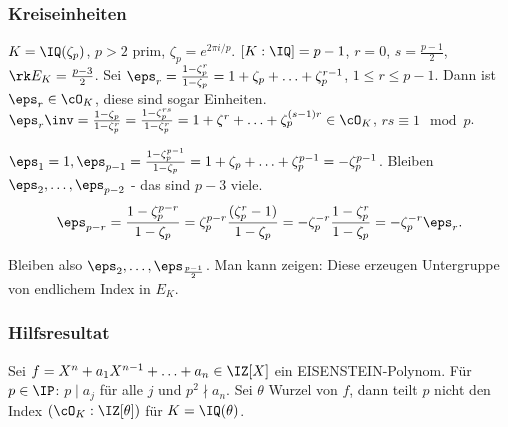 \subsubsection{Kreiseinheiten}
$K=\IQ(\zeta_p)$, $p>2$ prim, $\zeta_p=e^{2\pi i/p}$. $[K:\IQ]=p-1$, $r=0$, $s=\frac{p-1}{2}$, $\rk E_K=\frac{p-3}{2}$. Sei $\eps_r=\frac{1-\zeta_p^r}{1-\zeta_p}=1+\zeta_p+\ldots+\zeta_p^{r-1}$, $1\leq r\leq p-1$.
Dann ist $\eps_r\in\cO_K$, diese sind sogar Einheiten. $\eps_r\inv=\frac{1-\zeta_p}{1-\zeta_p^r}=\frac{1-\zeta_p^{rs}}{1-\zeta_p^r}=1+\zeta^r+\ldots +\zeta_p^{(s-1)r}\in\cO_K$, $rs\equiv 1\mod{p}$.

$\eps_1=1, \eps_{p-1}=\frac{1-\zeta_p^{p-1}}{1-\zeta_p}=1+\zeta_p+\ldots+\zeta_p^{p-1}=-\zeta_p^{p-1}$. Bleiben $\eps_2,\ldots,\eps_{p-2}$ -  das sind $p-3$ viele.
\[ \eps_{p-r} = \frac{1-\zeta_p^{p-r}}{1-\zeta_p}=\zeta_p^{p-r}\frac{(\zeta_p^r-1)}{1-\zeta_p}=-\zeta_p^{-r} \frac{1-\zeta_p^r}{1-\zeta_p}=-\zeta_p^{-r}\eps_r.\]

Bleiben also $\eps_2,\ldots,\eps_{\frac{p-1}{2}}$. Man kann zeigen: Diese erzeugen Untergruppe von endlichem Index in $E_K$.

\subsubsection{Hilfsresultat}
\begin{Fakt}
 Sei $f=X^n+a_1X^{n-1}+\ldots+a_n\in\IZ[X]$ ein EISENSTEIN-Polynom. Für $p\in\IP$: $p\mid a_j$ für alle $j$ und $p^2\nmid a_n$. Sei $\theta$ Wurzel von $f$, dann teilt $p$ nicht den Index $(\cO_K:\IZ[\theta])$ für $K=\IQ(\theta)$.
\end{Fakt}

